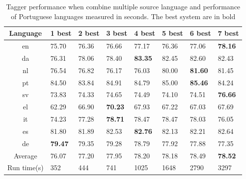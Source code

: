  \begin{table}
 \centering
     \begin{tabular}{clllllll}
     Language    & 1 best & 2 best      & 3 best       & 4 best       & 5 best       & 6 best       & 7 best      \\\hline
     en      &    75.70    &    76.36 &    76.66 &    77.17 &    76.36 &    77.06 &    \textbf{78.16} \\
     da      &    76.31    &    78.06 &    78.40 &    \textbf{83.35} &    82.45 &    82.60 &    82.43 \\
     nl      &    76.54    &    76.82 &    76.17 &    76.03 &    80.00 &    \textbf{81.60} &    81.45 \\
     pt      &    84.50    &    83.84 &    84.91 &    84.79 &    85.00 &    \textbf{85.46} &    84.24 \\
     sv      &    73.83    &    74.33 &    74.65 &    74.49 &    74.10 &    74.51 &    \textbf{76.66 }\\
     el      &    62.29    &    66.90 & \textbf{ 70.23} &    67.93 &    67.22 &    67.03 &    67.69 \\
     it      &    74.23    &    77.28 &    \textbf{78.71} &    78.47 &    78.47 &    78.03 &    76.05 \\
     es      &    81.80    &    81.89 &    82.53 &    \textbf{82.76} &    82.13 &    82.21 &    82.64 \\
     de      &  \textbf{  79.47}    &    79.35 &    79.28 &    78.79 &    77.92 &    77.88 &    77.35 \\\hline
     Average &    76.07    &    77.20 &    77.95 &    78.20 &    78.18 &    78.49 &    \textbf{78.52} \\
     Run time(s) & 352 & 444 & 741 & 1025 & 1648 & 2790 & 3297
     \end{tabular}    \caption{Tagger performance when combine multiple source language and performance of Portuguese languages measured in seconds. The best system are in bold }
     \label{tbl:multipleSource}
 \end{table}

